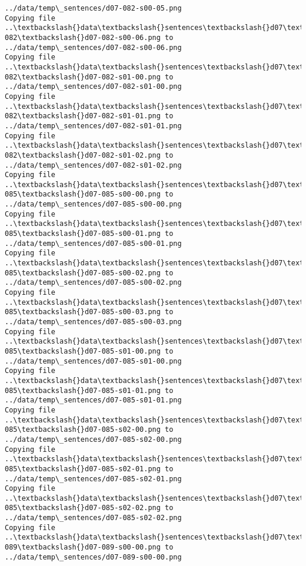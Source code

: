 \documentclass[11pt]{article}
\begin{document}
\begin{Verbatim}[commandchars=\\\{\}]
../data/temp\_sentences/d07-082-s00-05.png
Copying file ..\textbackslash{}data\textbackslash{}sentences\textbackslash{}d07\textbackslash{}d07-082\textbackslash{}d07-082-s00-06.png to
../data/temp\_sentences/d07-082-s00-06.png
Copying file ..\textbackslash{}data\textbackslash{}sentences\textbackslash{}d07\textbackslash{}d07-082\textbackslash{}d07-082-s01-00.png to
../data/temp\_sentences/d07-082-s01-00.png
Copying file ..\textbackslash{}data\textbackslash{}sentences\textbackslash{}d07\textbackslash{}d07-082\textbackslash{}d07-082-s01-01.png to
../data/temp\_sentences/d07-082-s01-01.png
Copying file ..\textbackslash{}data\textbackslash{}sentences\textbackslash{}d07\textbackslash{}d07-082\textbackslash{}d07-082-s01-02.png to
../data/temp\_sentences/d07-082-s01-02.png
Copying file ..\textbackslash{}data\textbackslash{}sentences\textbackslash{}d07\textbackslash{}d07-085\textbackslash{}d07-085-s00-00.png to
../data/temp\_sentences/d07-085-s00-00.png
Copying file ..\textbackslash{}data\textbackslash{}sentences\textbackslash{}d07\textbackslash{}d07-085\textbackslash{}d07-085-s00-01.png to
../data/temp\_sentences/d07-085-s00-01.png
Copying file ..\textbackslash{}data\textbackslash{}sentences\textbackslash{}d07\textbackslash{}d07-085\textbackslash{}d07-085-s00-02.png to
../data/temp\_sentences/d07-085-s00-02.png
Copying file ..\textbackslash{}data\textbackslash{}sentences\textbackslash{}d07\textbackslash{}d07-085\textbackslash{}d07-085-s00-03.png to
../data/temp\_sentences/d07-085-s00-03.png
Copying file ..\textbackslash{}data\textbackslash{}sentences\textbackslash{}d07\textbackslash{}d07-085\textbackslash{}d07-085-s01-00.png to
../data/temp\_sentences/d07-085-s01-00.png
Copying file ..\textbackslash{}data\textbackslash{}sentences\textbackslash{}d07\textbackslash{}d07-085\textbackslash{}d07-085-s01-01.png to
../data/temp\_sentences/d07-085-s01-01.png
Copying file ..\textbackslash{}data\textbackslash{}sentences\textbackslash{}d07\textbackslash{}d07-085\textbackslash{}d07-085-s02-00.png to
../data/temp\_sentences/d07-085-s02-00.png
Copying file ..\textbackslash{}data\textbackslash{}sentences\textbackslash{}d07\textbackslash{}d07-085\textbackslash{}d07-085-s02-01.png to
../data/temp\_sentences/d07-085-s02-01.png
Copying file ..\textbackslash{}data\textbackslash{}sentences\textbackslash{}d07\textbackslash{}d07-085\textbackslash{}d07-085-s02-02.png to
../data/temp\_sentences/d07-085-s02-02.png
Copying file ..\textbackslash{}data\textbackslash{}sentences\textbackslash{}d07\textbackslash{}d07-089\textbackslash{}d07-089-s00-00.png to
../data/temp\_sentences/d07-089-s00-00.png

\end{Verbatim}
\end{document}
